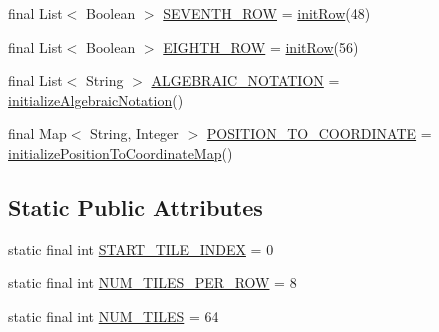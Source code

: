 \begin{DoxyCompactItemize}
\item 
final List$<$ Boolean $>$ \mbox{\hyperlink{enumcom_1_1chess_1_1engine_1_1classic_1_1board_1_1_board_utils_a578afd2d8aef137c34a94cb45730fd29}{S\+E\+V\+E\+N\+T\+H\+\_\+\+R\+OW}} = \mbox{\hyperlink{enumcom_1_1chess_1_1engine_1_1classic_1_1board_1_1_board_utils_a00765a9cb8974e6e54dfa2cb25de687b}{init\+Row}}(48)
\item 
final List$<$ Boolean $>$ \mbox{\hyperlink{enumcom_1_1chess_1_1engine_1_1classic_1_1board_1_1_board_utils_a5764fcb309884bd508bacc64adf5ef89}{E\+I\+G\+H\+T\+H\+\_\+\+R\+OW}} = \mbox{\hyperlink{enumcom_1_1chess_1_1engine_1_1classic_1_1board_1_1_board_utils_a00765a9cb8974e6e54dfa2cb25de687b}{init\+Row}}(56)
\item 
final List$<$ String $>$ \mbox{\hyperlink{enumcom_1_1chess_1_1engine_1_1classic_1_1board_1_1_board_utils_ac516f4c4def4ab1a65400e8ed6a66f2a}{A\+L\+G\+E\+B\+R\+A\+I\+C\+\_\+\+N\+O\+T\+A\+T\+I\+ON}} = \mbox{\hyperlink{enumcom_1_1chess_1_1engine_1_1classic_1_1board_1_1_board_utils_a32d498ecee277f23032f5df8ff25cedd}{initialize\+Algebraic\+Notation}}()
\item 
final Map$<$ String, Integer $>$ \mbox{\hyperlink{enumcom_1_1chess_1_1engine_1_1classic_1_1board_1_1_board_utils_a4eb835fa2bd840a4e901f1d1bacf8f0b}{P\+O\+S\+I\+T\+I\+O\+N\+\_\+\+T\+O\+\_\+\+C\+O\+O\+R\+D\+I\+N\+A\+TE}} = \mbox{\hyperlink{enumcom_1_1chess_1_1engine_1_1classic_1_1board_1_1_board_utils_a77b348bf1e79db761e1e96e5de3d238f}{initialize\+Position\+To\+Coordinate\+Map}}()
\end{DoxyCompactItemize}
\subsection*{Static Public Attributes}
\begin{DoxyCompactItemize}
\item 
static final int \mbox{\hyperlink{enumcom_1_1chess_1_1engine_1_1classic_1_1board_1_1_board_utils_a19d1d65e468b6348d7ee3b6c3c506a41}{S\+T\+A\+R\+T\+\_\+\+T\+I\+L\+E\+\_\+\+I\+N\+D\+EX}} = 0
\item 
static final int \mbox{\hyperlink{enumcom_1_1chess_1_1engine_1_1classic_1_1board_1_1_board_utils_a8bee373c2a407ee69b244e17dca9f9a0}{N\+U\+M\+\_\+\+T\+I\+L\+E\+S\+\_\+\+P\+E\+R\+\_\+\+R\+OW}} = 8
\item 
static final int \mbox{\hyperlink{enumcom_1_1chess_1_1engine_1_1classic_1_1board_1_1_board_utils_a59b3e0ca2f94fc613253fdb36ecb238e}{N\+U\+M\+\_\+\+T\+I\+L\+ES}} = 64
\end{DoxyCompactItemize}

